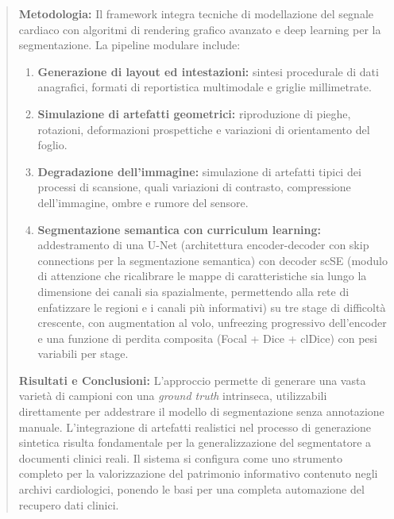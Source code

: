 \begin{abstract}
\noindent \textbf{Metodologia:} Il framework integra tecniche di modellazione del segnale cardiaco con algoritmi di rendering grafico avanzato e deep learning per la segmentazione. La pipeline modulare include:
\begin{enumerate}
    \item \textbf{Generazione di layout ed intestazioni:} sintesi procedurale di dati anagrafici, formati di reportistica multimodale e griglie millimetrate.
    \item \textbf{Simulazione di artefatti geometrici:} riproduzione di pieghe, rotazioni, deformazioni prospettiche e variazioni di orientamento del foglio.
    \item \textbf{Degradazione dell'immagine:} simulazione di artefatti tipici dei processi di scansione, quali variazioni di contrasto, compressione dell'immagine, ombre e rumore del sensore.
    \item \textbf{Segmentazione semantica con curriculum learning:} addestramento di una U-Net (architettura encoder-decoder con skip connections per la segmentazione semantica) con decoder scSE (modulo di attenzione che ricalibrare le mappe di caratteristiche sia lungo la dimensione dei canali sia spazialmente, permettendo alla rete di enfatizzare le regioni e i canali più informativi) su tre stage di difficoltà crescente, con augmentation al volo, unfreezing progressivo dell'encoder e una funzione di perdita composita (Focal + Dice + clDice) con pesi variabili per stage.
\end{enumerate}

\vspace{0.2cm}

\noindent \textbf{Risultati e Conclusioni:} L'approccio permette di generare una vasta varietà di campioni con una \textit{ground truth} intrinseca, utilizzabili direttamente per addestrare il modello di segmentazione senza annotazione manuale. L'integrazione di artefatti realistici nel processo di generazione sintetica risulta fondamentale per la generalizzazione del segmentatore a documenti clinici reali. Il sistema si configura come uno strumento completo per la valorizzazione del patrimonio informativo contenuto negli archivi cardiologici, ponendo le basi per una completa automazione del recupero dati clinici.
\end{abstract}